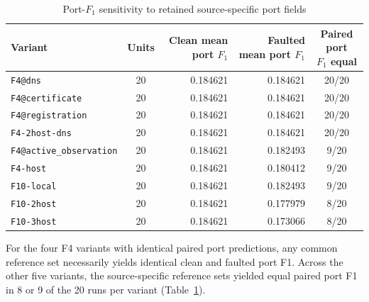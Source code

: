 \documentclass[sn-basic]{sn-jnl}%
\theoremstyle{thmstyleone}%
\theoremstyle{thmstyletwo}%
\theoremstyle{thmstylethree}%
\begin{document}
\begin{appendices}
\begin{table}[htbp]
\centering
\caption{Port-\(F_1\) sensitivity to retained source-specific port fields}
\label{tab:app-d3}
\small
\setlength{\tabcolsep}{3pt}
\renewcommand{\arraystretch}{1.1}
\begin{tabular*}{\linewidth}{@{\extracolsep{\fill}}lcrrc@{}}
\toprule
Variant & Units & \shortstack{Clean mean\\port \(F_1\)} & \shortstack{Faulted mean\\port \(F_1\)} & \shortstack{Paired port\\\(F_1\) equal} \\
\midrule
\texttt{F4@dns} & 20 & 0.184621 & 0.184621 & 20/20 \\
\texttt{F4@certificate} & 20 & 0.184621 & 0.184621 & 20/20 \\
\texttt{F4@registration} & 20 & 0.184621 & 0.184621 & 20/20 \\
\texttt{F4-2host-dns} & 20 & 0.184621 & 0.184621 & 20/20 \\
\texttt{F4@active\_observation} & 20 & 0.184621 & 0.182493 & 9/20 \\
\texttt{F4-host} & 20 & 0.184621 & 0.180412 & 9/20 \\
\texttt{F10-local} & 20 & 0.184621 & 0.182493 & 9/20 \\
\texttt{F10-2host} & 20 & 0.184621 & 0.177979 & 8/20 \\
\texttt{F10-3host} & 20 & 0.184621 & 0.173066 & 8/20 \\
\bottomrule
\end{tabular*}
\end{table}

For the four F4 variants with identical paired port predictions, any common reference set necessarily yields identical clean and faulted port F1. Across the other five variants, the source-specific reference sets yielded equal paired port F1 in 8 or 9 of the 20 runs per variant (Table~\ref{tab:app-d3}).

\end{appendices}

\clearpage

\end{document}
